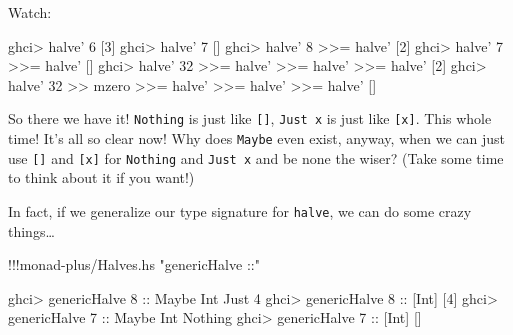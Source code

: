 \documentclass[]{article}
\newenvironment{Shaded}{}{}
\newcommand{\DataTypeTok}[1]{\textcolor[rgb]{0.56,0.13,0.00}{{#1}}}
\newcommand{\DecValTok}[1]{\textcolor[rgb]{0.25,0.63,0.44}{{#1}}}
\newcommand{\StringTok}[1]{\textcolor[rgb]{0.25,0.44,0.63}{{#1}}}
\newcommand{\OtherTok}[1]{\textcolor[rgb]{0.00,0.44,0.13}{{#1}}}
\newcommand{\FunctionTok}[1]{\textcolor[rgb]{0.02,0.16,0.49}{{#1}}}
\newcommand{\NormalTok}[1]{{#1}}
\begin{document}
Watch:

\begin{Shaded}
\begin{Highlighting}[]
\NormalTok{ghci}\FunctionTok{>} \NormalTok{halve' }\DecValTok{6}
\NormalTok{[}\DecValTok{3}\NormalTok{]}
\NormalTok{ghci}\FunctionTok{>} \NormalTok{halve' }\DecValTok{7}
\NormalTok{[]}
\NormalTok{ghci}\FunctionTok{>} \NormalTok{halve' }\DecValTok{8} \FunctionTok{>>=} \NormalTok{halve'}
\NormalTok{[}\DecValTok{2}\NormalTok{]}
\NormalTok{ghci}\FunctionTok{>} \NormalTok{halve' }\DecValTok{7} \FunctionTok{>>=} \NormalTok{halve'}
\NormalTok{[]}
\NormalTok{ghci}\FunctionTok{>} \NormalTok{halve' }\DecValTok{32} \FunctionTok{>>=} \NormalTok{halve' }\FunctionTok{>>=} \NormalTok{halve' }\FunctionTok{>>=} \NormalTok{halve'}
\NormalTok{[}\DecValTok{2}\NormalTok{]}
\NormalTok{ghci}\FunctionTok{>} \NormalTok{halve' }\DecValTok{32} \FunctionTok{>>} \NormalTok{mzero }\FunctionTok{>>=} \NormalTok{halve' }\FunctionTok{>>=} \NormalTok{halve' }\FunctionTok{>>=} \NormalTok{halve'}
\NormalTok{[]}
\end{Highlighting}
\end{Shaded}

So there we have it! \texttt{Nothing} is just like \texttt{{[}{]}},
\texttt{Just\ x} is just like \texttt{{[}x{]}}. This whole time! It's
all so clear now! Why does \texttt{Maybe} even exist, anyway, when we
can just use \texttt{{[}{]}} and \texttt{{[}x{]}} for \texttt{Nothing}
and \texttt{Just\ x} and be none the wiser? (Take some time to think
about it if you want!)

In fact, if we generalize our type signature for \texttt{halve}, we can
do some crazy things\ldots{}

\begin{Shaded}
\begin{Highlighting}[]
\FunctionTok{!!!}\NormalTok{monad}\FunctionTok{-}\NormalTok{plus}\FunctionTok{/}\NormalTok{Halves.hs }\StringTok{"genericHalve ::"}
\end{Highlighting}
\end{Shaded}

\begin{Shaded}
\begin{Highlighting}[]
\NormalTok{ghci}\FunctionTok{>} \NormalTok{genericHalve }\DecValTok{8}\OtherTok{ ::} \DataTypeTok{Maybe} \DataTypeTok{Int}
\DataTypeTok{Just} \DecValTok{4}
\NormalTok{ghci}\FunctionTok{>} \NormalTok{genericHalve }\DecValTok{8}\OtherTok{ ::} \NormalTok{[}\DataTypeTok{Int}\NormalTok{]}
\NormalTok{[}\DecValTok{4}\NormalTok{]}
\NormalTok{ghci}\FunctionTok{>} \NormalTok{genericHalve }\DecValTok{7}\OtherTok{ ::} \DataTypeTok{Maybe} \DataTypeTok{Int}
\DataTypeTok{Nothing}
\NormalTok{ghci}\FunctionTok{>} \NormalTok{genericHalve }\DecValTok{7}\OtherTok{ ::} \NormalTok{[}\DataTypeTok{Int}\NormalTok{]}
\NormalTok{[]}
\end{Highlighting}
\end{Shaded}
\end{document}
